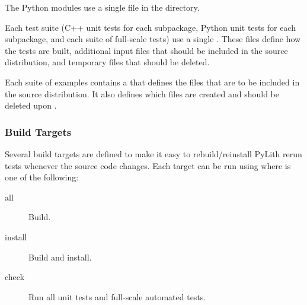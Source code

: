 The Python modules use a single  file in
the  directory.

Each test suite (C++ unit tests for each subpackage, Python unit tests
for each subpackage, and each suite of full-scale tests) use a single
. These files define how the tests are built,
additional input files that should be included in the source
distribution, and temporary files that should be deleted.

Each suite of examples contains a  that defines
the files that are to be included in the source distribution. It also
defines which files are created and should be deleted upon
.

\subsubsection{Build Targets}

Several build targets are defined to make it easy to rebuild/reinstall
PyLith rerun tests whenever the source code changes. Each target can
be run using  where  is
one of the following:

\begin{description}
\item[all] Build.
\item[install] Build and install.
\item[check] Run all unit tests and full-scale automated tests.
\end{description}





